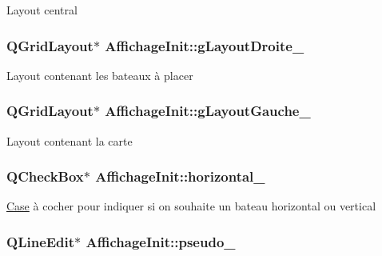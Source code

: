 Layout central \hypertarget{classAffichageInit_a30c6eb873576eb8c416091b3fe54d46a}{
\subsubsection[{g\+Layout\+Droite\+\_\+}]{\setlength{\rightskip}{0pt plus 5cm}Q\+Grid\+Layout$\ast$ Affichage\+Init\+::g\+Layout\+Droite\+\_\+\hspace{0.3cm}{\ttfamily [protected]}}}\label{classAffichageInit_a30c6eb873576eb8c416091b3fe54d46a}
Layout contenant les bateaux à placer \hypertarget{classAffichageInit_a7e46084cc3c86b029ac04b59f3e70d5e}{
\subsubsection[{g\+Layout\+Gauche\+\_\+}]{\setlength{\rightskip}{0pt plus 5cm}Q\+Grid\+Layout$\ast$ Affichage\+Init\+::g\+Layout\+Gauche\+\_\+\hspace{0.3cm}{\ttfamily [protected]}}}\label{classAffichageInit_a7e46084cc3c86b029ac04b59f3e70d5e}
Layout contenant la carte \hypertarget{classAffichageInit_ad3535a45425dc7a11b8f0ed8c4b07f4c}{
\subsubsection[{horizontal\+\_\+}]{\setlength{\rightskip}{0pt plus 5cm}Q\+Check\+Box$\ast$ Affichage\+Init\+::horizontal\+\_\+\hspace{0.3cm}{\ttfamily [protected]}}}\label{classAffichageInit_ad3535a45425dc7a11b8f0ed8c4b07f4c}
\hyperlink{classCase}{Case} à cocher pour indiquer si on souhaite un bateau horizontal ou vertical \hypertarget{classAffichageInit_a5327093a0df1060ada2be6678a3d2c2e}{
\subsubsection[{pseudo\+\_\+}]{\setlength{\rightskip}{0pt plus 5cm}Q\+Line\+Edit$\ast$ Affichage\+Init\+::pseudo\+\_\+\hspace{0.3cm}{\ttfamily [protected]}}}\label{classAffichageInit_a5327093a0df1060ada2be6678a3d2c2e}
